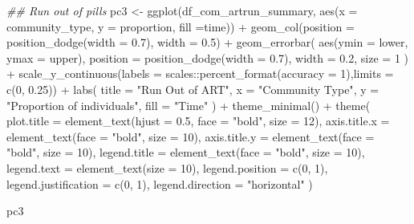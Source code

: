 \documentclass[
  letterpaper,
  DIV=11,
  numbers=noendperiod]{scrartcl}
\newenvironment{Shaded}{\begin{snugshade}}{\end{snugshade}}
\newcommand{\AttributeTok}[1]{\textcolor[rgb]{0.40,0.45,0.13}{#1}}
\newcommand{\DecValTok}[1]{\textcolor[rgb]{0.68,0.00,0.00}{#1}}
\newcommand{\DocumentationTok}[1]{\textcolor[rgb]{0.37,0.37,0.37}{\textit{#1}}}
\newcommand{\FloatTok}[1]{\textcolor[rgb]{0.68,0.00,0.00}{#1}}
\newcommand{\FunctionTok}[1]{\textcolor[rgb]{0.28,0.35,0.67}{#1}}
\newcommand{\NormalTok}[1]{\textcolor[rgb]{0.00,0.23,0.31}{#1}}
\newcommand{\OtherTok}[1]{\textcolor[rgb]{0.00,0.23,0.31}{#1}}
\newcommand{\SpecialCharTok}[1]{\textcolor[rgb]{0.37,0.37,0.37}{#1}}
\newcommand{\StringTok}[1]{\textcolor[rgb]{0.13,0.47,0.30}{#1}}
\begin{document}
\begin{Shaded}
\begin{Highlighting}[]
\DocumentationTok{\#\# Run out of pills}
\NormalTok{pc3 }\OtherTok{\textless{}{-}} \FunctionTok{ggplot}\NormalTok{(df\_com\_artrun\_summary, }\FunctionTok{aes}\NormalTok{(}\AttributeTok{x =}\NormalTok{ community\_type, }\AttributeTok{y =}\NormalTok{ proportion, }\AttributeTok{fill =}\NormalTok{time)) }\SpecialCharTok{+}
  \FunctionTok{geom\_col}\NormalTok{(}\AttributeTok{position =} \FunctionTok{position\_dodge}\NormalTok{(}\AttributeTok{width =} \FloatTok{0.7}\NormalTok{), }\AttributeTok{width =} \FloatTok{0.5}\NormalTok{) }\SpecialCharTok{+}
  \FunctionTok{geom\_errorbar}\NormalTok{(}
    \FunctionTok{aes}\NormalTok{(}\AttributeTok{ymin =}\NormalTok{ lower, }\AttributeTok{ymax =}\NormalTok{ upper),}
    \AttributeTok{position =} \FunctionTok{position\_dodge}\NormalTok{(}\AttributeTok{width =} \FloatTok{0.7}\NormalTok{),}
    \AttributeTok{width =} \FloatTok{0.2}\NormalTok{,}
    \AttributeTok{size =} \DecValTok{1}
\NormalTok{  ) }\SpecialCharTok{+}
  \FunctionTok{scale\_y\_continuous}\NormalTok{(}\AttributeTok{labels =}\NormalTok{ scales}\SpecialCharTok{::}\FunctionTok{percent\_format}\NormalTok{(}\AttributeTok{accuracy =} \DecValTok{1}\NormalTok{),}\AttributeTok{limits =} \FunctionTok{c}\NormalTok{(}\DecValTok{0}\NormalTok{, }\FloatTok{0.25}\NormalTok{)) }\SpecialCharTok{+}
  \FunctionTok{labs}\NormalTok{(}
    \AttributeTok{title =}  \StringTok{"Run Out of ART"}\NormalTok{,}
    \AttributeTok{x =} \StringTok{"Community Type"}\NormalTok{,}
    \AttributeTok{y =} \StringTok{"Proportion of individuals"}\NormalTok{,}
    \AttributeTok{fill =} \StringTok{"Time"}
\NormalTok{  ) }\SpecialCharTok{+}
  \FunctionTok{theme\_minimal}\NormalTok{() }\SpecialCharTok{+}
  \FunctionTok{theme}\NormalTok{(}
    \AttributeTok{plot.title =}  \FunctionTok{element\_text}\NormalTok{(}\AttributeTok{hjust =} \FloatTok{0.5}\NormalTok{, }\AttributeTok{face =} \StringTok{"bold"}\NormalTok{, }\AttributeTok{size =} \DecValTok{12}\NormalTok{),}
    \AttributeTok{axis.title.x =} \FunctionTok{element\_text}\NormalTok{(}\AttributeTok{face =} \StringTok{"bold"}\NormalTok{, }\AttributeTok{size =} \DecValTok{10}\NormalTok{),}
    \AttributeTok{axis.title.y =} \FunctionTok{element\_text}\NormalTok{(}\AttributeTok{face =} \StringTok{"bold"}\NormalTok{, }\AttributeTok{size =} \DecValTok{10}\NormalTok{),}
    \AttributeTok{legend.title =} \FunctionTok{element\_text}\NormalTok{(}\AttributeTok{face =} \StringTok{"bold"}\NormalTok{, }\AttributeTok{size =} \DecValTok{10}\NormalTok{),}
    \AttributeTok{legend.text =} \FunctionTok{element\_text}\NormalTok{(}\AttributeTok{size =} \DecValTok{10}\NormalTok{),}
    \AttributeTok{legend.position =} \FunctionTok{c}\NormalTok{(}\DecValTok{0}\NormalTok{, }\DecValTok{1}\NormalTok{),}
    \AttributeTok{legend.justification =} \FunctionTok{c}\NormalTok{(}\DecValTok{0}\NormalTok{, }\DecValTok{1}\NormalTok{),}
    \AttributeTok{legend.direction =} \StringTok{"horizontal"}
\NormalTok{  )}

\NormalTok{pc3}
\end{Highlighting}
\end{Shaded}
\end{document}
